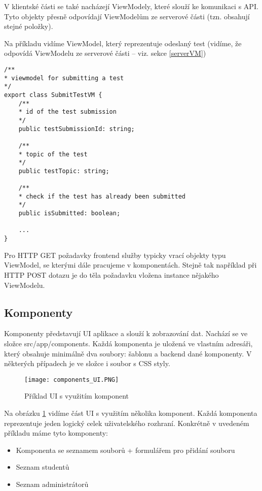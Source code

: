V klientské části se také nacházejí ViewModely, které slouží ke komunikaci s API. Tyto objekty přesně odpovídají ViewModelům ze serverové části (tzn. obsahují stejné položky).

Na příkladu vidíme ViewModel, který reprezentuje odeslaný test (vidíme, že odpovídá ViewModelu ze serverové části -- viz. sekce \ref{serverVM})
\begin{lstlisting}
/**
* viewmodel for submitting a test
*/
export class SubmitTestVM {
	/**
	* id of the test submission
	*/
	public testSubmissionId: string;
	
	/**
	* topic of the test
	*/
	public testTopic: string;
	
	/**
	* check if the test has already been submitted
	*/
	public isSubmitted: boolean;
	
	...
}
\end{lstlisting}

Pro HTTP GET požadavky frontend služby typicky vrací objekty typu ViewModel, se kterými dále pracujeme v komponentách. Stejně tak například při HTTP POST dotazu je do těla požadavku vložena instance nějakého ViewModelu.

\newpage

\subsection{Komponenty}

Komponenty představují UI aplikace a slouží k zobrazování dat. Nachází se ve složce src/app/components. Každá komponenta je uložená ve vlastním adresáři, který obsahuje minimálně dva soubory: šablonu a backend dané komponenty. V některých případech je ve složce i soubor s CSS styly.

\begin{figure}
	\centering
	\texttt{[image: components\_UI.PNG]}
	\caption{Příklad UI s využitím komponent}
	\label{fig:Components}
\end{figure}

Na obrázku \ref{fig:Components} vidíme část UI s využitím několika komponent. Každá komponenta reprezentuje jeden logický celek uživatelského rozhraní. Konkrétně v uvedeném příkladu máme tyto komponenty:

\begin{itemize}
	\item Komponenta se seznamem souborů + formulářem pro přidání souboru
	\item Seznam studentů
	\item Seznam administrátorů
\end{itemize}

